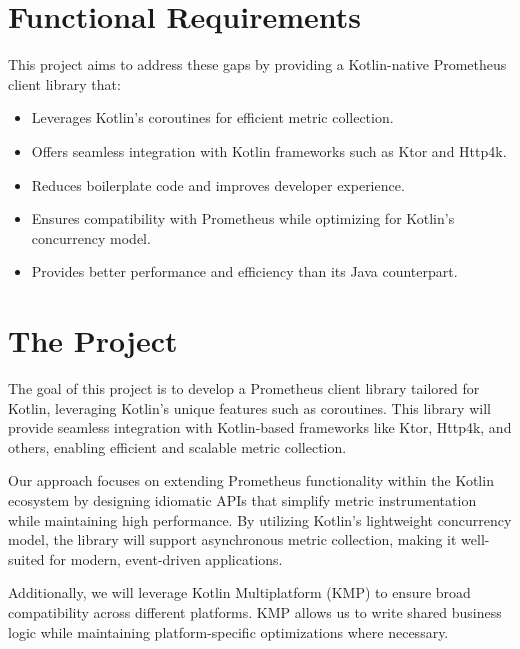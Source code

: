 \documentclass[a4paper,twoside,11pt]{article}
\begin{document}
\section{Functional Requirements}
This project aims to address these gaps by providing a Kotlin-native Prometheus client library that:
\begin{itemize}
    \item Leverages Kotlin’s coroutines for efficient metric collection.
    \item Offers seamless integration with Kotlin frameworks such as Ktor and Http4k.
    \item Reduces boilerplate code and improves developer experience.
    \item Ensures compatibility with Prometheus while optimizing for Kotlin’s concurrency model.
    \item Provides better performance and efficiency than its Java counterpart.
\end{itemize}

\section{The Project}
The goal of this project is to develop a Prometheus client library tailored for Kotlin, leveraging Kotlin's unique features such as coroutines. This library will provide seamless integration with Kotlin-based frameworks like Ktor, Http4k, and others, enabling efficient and scalable metric collection.

Our approach focuses on extending Prometheus functionality within the Kotlin ecosystem by designing idiomatic APIs that simplify metric instrumentation while maintaining high performance. By utilizing Kotlin’s lightweight concurrency model, the library will support asynchronous metric collection, making it well-suited for modern, event-driven applications.

Additionally, we will leverage Kotlin Multiplatform (KMP) to ensure broad compatibility across different platforms. KMP allows us to write shared business logic while maintaining platform-specific optimizations where necessary.
\end{document}
